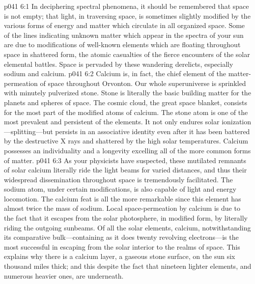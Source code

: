 \vs p041 6:1 In deciphering spectral phenomena, it should be remembered that space is not empty; that light, in traversing space, is sometimes slightly modified by the various forms of energy and matter which circulate in all organized space. Some of the lines indicating unknown matter which appear in the spectra of your sun are due to modifications of well\hyp{}known elements which are floating throughout space in shattered form, the atomic casualties of the fierce encounters of the solar elemental battles. Space is pervaded by these wandering derelicts, especially sodium and calcium.
\vs p041 6:2 Calcium is, in fact, the chief element of the matter\hyp{}permeation of space throughout Orvonton. Our whole superuniverse is sprinkled with minutely pulverized stone. Stone is literally the basic building matter for the planets and spheres of space. The cosmic cloud, the great space blanket, consists for the most part of the modified atoms of calcium. The stone atom is one of the most prevalent and persistent of the elements. It not only endures solar ionization---splitting---but persists in an associative identity even after it has been battered by the destructive X rays and shattered by the high solar temperatures. Calcium possesses an individuality and a longevity excelling all of the more common forms of matter.
\pc \vs p041 6:3 As your physicists have suspected, these mutilated remnants of solar calcium literally ride the light beams for varied distances, and thus their widespread dissemination throughout space is tremendously facilitated. The sodium atom, under certain modifications, is also capable of light and energy locomotion. The calcium feat is all the more remarkable since this element has almost twice the mass of sodium. Local space\hyp{}permeation by calcium is due to the fact that it escapes from the solar photosphere, in modified form, by literally riding the outgoing sunbeams. Of all the solar elements, calcium, notwithstanding its comparative bulk---containing as it does twenty revolving electrons---is the most successful in escaping from the solar interior to the realms of space. This explains why there is a calcium layer, a gaseous stone surface, on the sun six thousand miles thick; and this despite the fact that nineteen lighter elements, and numerous heavier ones, are underneath.
